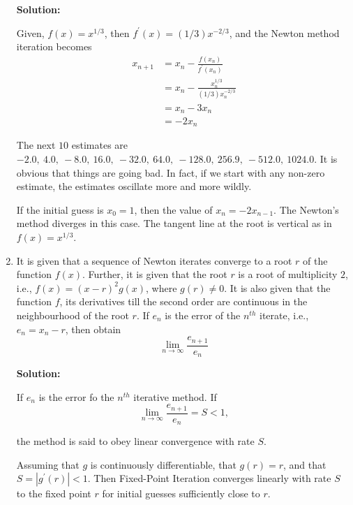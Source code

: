 \documentclass[a4paper,11pt]{report}
\begin{document}
\begin{enumerate}
    \textbf{Solution:}

    Given, $f(x) = x^{1/3}$, then $f^{\prime}(x) = (1/3)x^{-2/3}$, and the 
    Newton method iteration becomes
    \begin{equation*}
    \begin{aligned}
    x_{n+1} &= x_{n} - \frac{f(x_{n})}{f^{\prime}(x_{n})} \\
    &= x_{n} - \frac{x_{n}^{1/3}}{(1/3)x_{n}^{-2/3}} \\
    &= x_{n} - 3x_{n} \\
    &= -2x_{n}
    \end{aligned}
    \end{equation*}
    
    The next $10$ estimates are $-2.0,\ 4.0,\ -8.0,\ 16.0,\ -32.0,\ 64.0,\
    -128.0,\ 256.9,\ -512.0,\ 1024.0$. It is obvious that things are going bad.
    In fact, if we start with any non-zero estimate, the estimates oscillate 
    more and more wildly.

    If the initial guess is $x_{0} = 1$, then the value of $x_{n} = -2x_{n-1}$.
    The Newton's method diverges in this case. The tangent line at the root is
    vertical as in $f(x) = x^{1/3}$.






    \item It is given that a sequence of Newton iterates converge to a root $r$ of the
    function $f(x)$. Further, it is given that the root $r$ is a root of multiplicity
    $2$, i.e., $f(x) = (x - r)^{2} g(x)$, where $g(r) \ne 0$. It is also given that the
    function $f$, its derivatives till the second order are continuous in the
    neighbourhood of the root $r$. If $e_{n}$ is the error of the $n^{th}$ iterate,
    i.e., $e_{n} = x_{n} - r$, then obtain
    \begin{equation*}
    \lim_{n \rightarrow \infty} \frac{e_{n+1}}{e_{n}}
    \end{equation*}

    \textbf{Solution:}

    If $e_{n}$ is the error fo the $n^{th}$ iterative method. If
    \begin{equation*}
    \lim_{n \rightarrow \infty} \frac{e_{n+1}}{e_{n}} = S < 1,
    \end{equation*}

    the method is said to obey linear convergence with rate $S$.

    Assuming that $g$ is continuously differentiable, that $g(r) = r$, and that 
    $S = |g^{\prime}(r)| < 1$. Then Fixed-Point Iteration converges linearly 
    with rate $S$ to the fixed point $r$ for initial guesses sufficiently close
    to $r$.
    

\end{enumerate}
\end{document}
